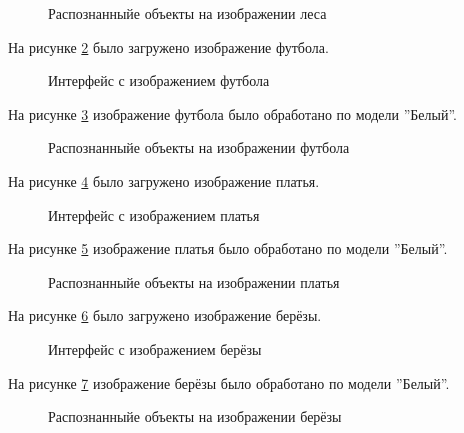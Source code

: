 \begin{figure}[H]
\caption{Распознанныйе объекты на изображении леса}
\label{systemtest_responce10:image}
\end{figure}
На рисунке \ref{systemtest_responce11:image} было загружено изображение футбола.

\begin{figure}[H]
\caption{Интерфейс с изображением футбола}
\label{systemtest_responce11:image}
\end{figure}

На рисунке \ref{systemtest_responce12:image} изображение футбола было обработано по модели ''Белый''.

\begin{figure}[H]
\caption{Распознанныйе объекты на изображении футбола}
\label{systemtest_responce12:image}
\end{figure}
На рисунке \ref{systemtest_responce13:image} было загружено изображение платья.

\begin{figure}[H]
\caption{Интерфейс с изображением платья}
\label{systemtest_responce13:image}
\end{figure}

На рисунке \ref{systemtest_responce14:image} изображение платья было обработано по модели ''Белый''.

\begin{figure}[H]
\caption{Распознанныйе объекты на изображении платья}
\label{systemtest_responce14:image}
\end{figure}

На рисунке \ref{systemtest_responce15:image} было загружено изображение берёзы.

\begin{figure}[H]
\caption{Интерфейс с изображением берёзы}
\label{systemtest_responce15:image}
\end{figure}

На рисунке \ref{systemtest_responce16:image} изображение берёзы было обработано по модели ''Белый''.

\begin{figure}[H]
\caption{Распознанныйе объекты на изображении берёзы}
\label{systemtest_responce16:image}
\end{figure}